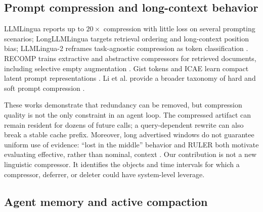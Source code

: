 \documentclass[10pt,twocolumn]{article}
\begin{document}
\subsection{Prompt compression and long-context behavior}

LLMLingua reports up to $20\times$ compression with little loss on several prompting scenarios;
LongLLMLingua targets retrieval ordering and long-context position bias; LLMLingua-2 reframes
task-agnostic compression as token classification \cite{jiang2023llmlingua,jiang2024longllmlingua,
pan2024llmlingua2}.  RECOMP trains extractive and abstractive compressors for retrieved documents,
including selective empty augmentation \cite{xu2024recomp}.  Gist tokens and ICAE learn compact
latent prompt representations \cite{mu2023gist,ge2024icae}.  Li et al. provide a broader taxonomy of
hard and soft prompt compression \cite{li2025survey}.

These works demonstrate that redundancy can be removed, but compression quality is not the only
constraint in an agent loop.  The compressed artifact can remain resident for dozens of future calls;
a query-dependent rewrite can also break a stable cache prefix.  Moreover, long advertised windows do
not guarantee uniform use of evidence: ``lost in the middle'' behavior and RULER both motivate
evaluating effective, rather than nominal, context \cite{liu2024lost,hsieh2024ruler}.  Our
contribution is not a new linguistic compressor.  It identifies the objects and time intervals for
which a compressor, deferrer, or deleter could have system-level leverage.

\subsection{Agent memory and active compaction}
\end{document}
